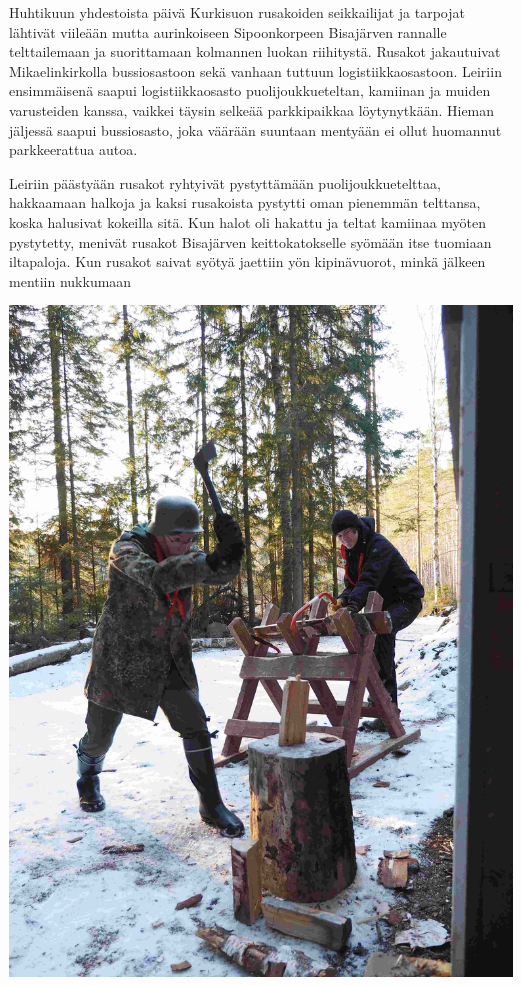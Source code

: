 \begin{multicols}{2}

Huhtikuun yhdestoista päivä Kurkisuon rusakoiden seikkailijat ja tarpojat
lähtivät viileään mutta aurinkoiseen Sipoonkorpeen Bisajärven rannalle
telttailemaan ja suorittamaan kolmannen luokan riihitystä. Rusakot jakautuivat
Mikaelinkirkolla bussiosastoon sekä vanhaan tuttuun logistiikkaosastoon.
Leiriin ensimmäisenä saapui logistiikkaosasto puolijoukkueteltan, kamiinan ja
muiden varusteiden kanssa, vaikkei täysin selkeää parkkipaikkaa löytynytkään.
Hieman jäljessä saapui bussiosasto, joka väärään suuntaan mentyään ei ollut
huomannut parkkeerattua autoa.

Leiriin päästyään rusakot ryhtyivät pystyttämään puolijoukkuetelttaa,
hakkaamaan halkoja ja kaksi rusakoista pystytti oman pienemmän telttansa, koska
halusivat kokeilla sitä. Kun halot oli hakattu ja teltat kamiinaa myöten
pystytetty, menivät rusakot Bisajärven keittokatokselle syömään itse tuomiaan
iltapaloja. Kun rusakot saivat syötyä jaettiin yön kipinävuorot, minkä jälkeen
mentiin nukkumaan

\vspace*{-0.16cm}

\columnbreak

\begin{center}
	\noindent\includegraphics[height=0.9\linewidth,angle=90]{assets/telttaretki5}
\end{center}


\end{multicols}
